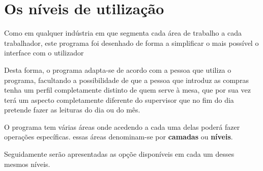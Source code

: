  \chapter{Os níveis de utilização}

Como em qualquer indústria em que segmenta cada área de trabalho a cada trabalhador,
 este programa foi desenhado de forma a simplificar o mais possível o interface com
o utilizador


Desta forma, o programa adapta-se de acordo com a pessoa que utiliza o programa, facultando
a possibilidade de que a pessoa que introduz as compras tenha um perfil completamente distinto
de quem serve à mesa, que por sua vez terá um aspecto completamente diferente do supervisor
que no fim do dia pretende fazer as leituras do dia ou do mês.


O programa tem várias áreas onde acedendo a cada uma delas poderá fazer operações específicas. 
essas áreas denominam-se por \textbf{camadas} ou \textbf{níveis}.


Seguidamente serão apresentadas as opçõe disponíveis em cada um desses mesmos níveis.
